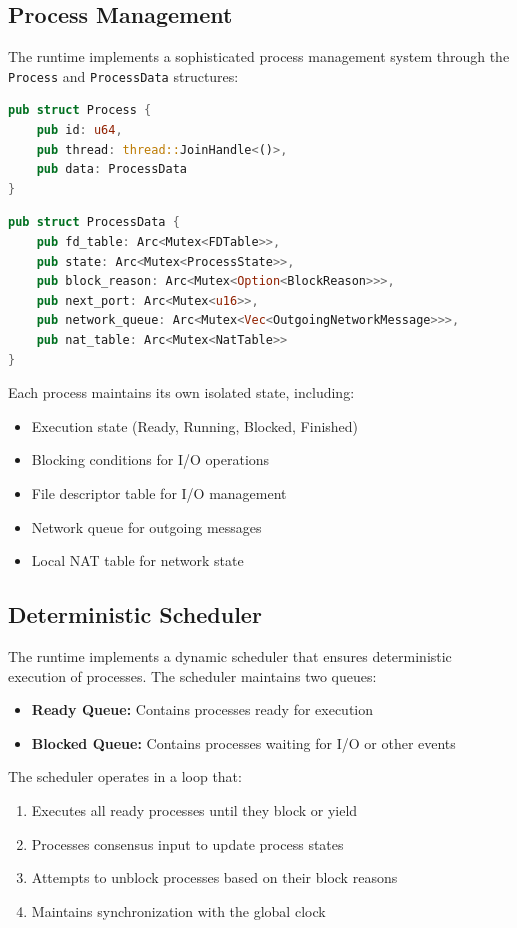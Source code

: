 \documentclass[10pt, 
]{IEEEtran}
\begin{document}
\subsection{Process Management}

The runtime implements a sophisticated process management system through the \texttt{Process} and \texttt{ProcessData} structures:

\begin{lstlisting}[language=Rust]
pub struct Process {
    pub id: u64,
    pub thread: thread::JoinHandle<()>,
    pub data: ProcessData
}
\end{lstlisting}
\begin{lstlisting}[language=Rust]
pub struct ProcessData {
    pub fd_table: Arc<Mutex<FDTable>>,    
    pub state: Arc<Mutex<ProcessState>>,  
    pub block_reason: Arc<Mutex<Option<BlockReason>>>,
    pub next_port: Arc<Mutex<u16>>,
    pub network_queue: Arc<Mutex<Vec<OutgoingNetworkMessage>>>,
    pub nat_table: Arc<Mutex<NatTable>> 
}
\end{lstlisting}

Each process maintains its own isolated state, including:
\begin{itemize}
    \item Execution state (Ready, Running, Blocked, Finished)
    \item Blocking conditions for I/O operations
    \item File descriptor table for I/O management
    \item Network queue for outgoing messages
    \item Local NAT table for network state
\end{itemize}

\subsection{Deterministic Scheduler}

The runtime implements a dynamic scheduler that ensures deterministic execution of processes. The scheduler maintains two queues:

\begin{itemize}
    \item \textbf{Ready Queue:} Contains processes ready for execution
    \item \textbf{Blocked Queue:} Contains processes waiting for I/O or other events
\end{itemize}

The scheduler operates in a loop that:
\begin{enumerate}
    \item Executes all ready processes until they block or yield
    \item Processes consensus input to update process states
    \item Attempts to unblock processes based on their block reasons
    \item Maintains synchronization with the global clock
\end{enumerate}
\end{document}
